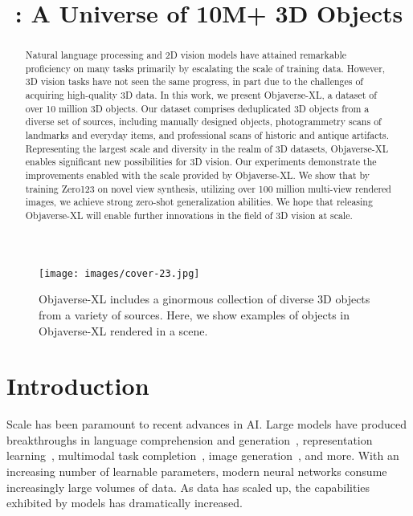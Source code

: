 \title{\dataset: A Universe of 10M+ 3D Objects}



\maketitle

\begin{figure}[h!]
  \vspace{-0.45in}
  \centering
  \texttt{[image: images/cover-23.jpg]}
  \caption{Objaverse-XL includes a ginormous collection of diverse 3D objects from a variety of sources. Here, we show examples of objects in Objaverse-XL rendered in a scene.}
  \vspace{-0.05in}
  \label{fig:teaser}
\end{figure}

\begin{abstract}
Natural language processing and 2D vision models have attained remarkable proficiency on many tasks primarily by escalating the scale of training data. However, 3D vision tasks have not seen the same progress, in part due to the challenges of acquiring high-quality 3D data. In this work, we present Objaverse-XL, a dataset of over 10 million 3D objects. Our dataset comprises deduplicated 3D objects from a diverse set of sources, including manually designed objects, photogrammetry scans of landmarks and everyday items, and professional scans of historic and antique artifacts. Representing the largest scale and diversity in the realm of 3D datasets, Objaverse-XL enables significant new possibilities for 3D vision. Our experiments demonstrate the improvements enabled with the scale provided by Objaverse-XL. We show that by training Zero123 on novel view synthesis, utilizing over 100 million multi-view rendered images, we achieve strong zero-shot generalization abilities. We hope that releasing Objaverse-XL will enable further innovations in the field of 3D vision at scale.
\end{abstract}

\section{Introduction}

Scale has been paramount to recent advances in AI. Large models have produced breakthroughs in language comprehension and generation~\cite{brown2020language,openai2023gpt}, representation learning~\cite{radford2021learning}, multimodal task completion~\cite{alayrac2022flamingo,Lu2022UnifiedIOAU}, image generation~\cite{ramesh2022hierarchical,rombach2022high}, and more. With an increasing number of learnable parameters, modern neural networks consume increasingly large volumes of data. As data has scaled up, the capabilities exhibited by models has dramatically increased.

